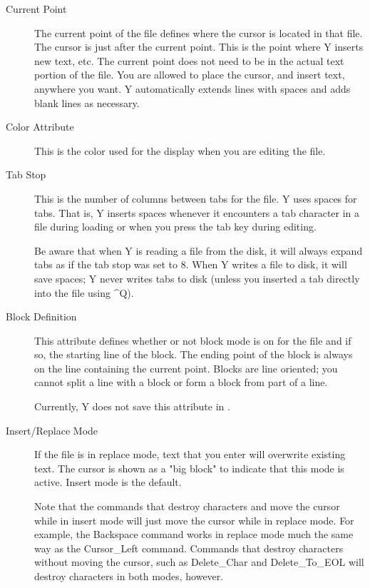 \begin{description}

\item[Current Point] The current point of the file defines where the cursor is located in that
  file. The cursor is just after the current point. This is the point where Y inserts new text,
  etc. The current point does not need to be in the actual text portion of the file. You are
  allowed to place the cursor, and insert text, anywhere you want. Y automatically extends lines
  with spaces and adds blank lines as necessary.

\item[Color Attribute] This is the color used for the display when you are editing the file.

\item[Tab Stop] This is the number of columns between tabs for the file. Y uses spaces for
  tabs. That is, Y inserts spaces whenever it encounters a tab character in a file during
  loading or when you press the tab key during editing.

  Be aware that when Y is reading a file from the disk, it will always expand tabs as if the tab
  stop was set to 8. When Y writes a file to disk, it will save spaces; Y never writes tabs to
  disk (unless you inserted a tab directly into the file using \textasciicircum Q).

\item[Block Definition] This attribute defines whether or not block mode is on for the file and
  if so, the starting line of the block. The ending point of the block is always on the line
  containing the current point. Blocks are line oriented; you cannot split a line with a block
  or form a block from part of a line.

  Currently, Y does not save this attribute in .

\item[Insert/Replace Mode] If the file is in replace mode, text that you enter will overwrite
  existing text. The cursor is shown as a "big block" to indicate that this mode is active.
  Insert mode is the default.

  Note that the commands that destroy characters and move the cursor while in insert mode will
  just move the cursor while in replace mode. For example, the Backspace command works in
  replace mode much the same way as the Cursor\_Left command. Commands that destroy characters
  without moving the cursor, such as Delete\_Char and Delete\_To\_EOL will destroy characters in
  both modes, however.

\end{description}

